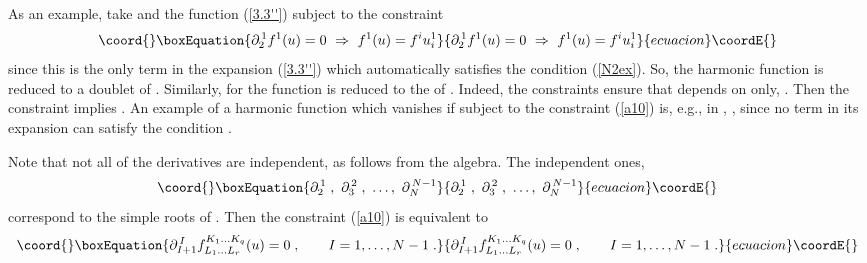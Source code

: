 \documentclass[a4paper,12pt]{article}
\begin{document}
As an example, take \coordHE{} and the function \coordHE{} (\ref{3.3''}) 
subject to the constraint 
\begin{equation}\coord{}\boxEquation{\label{N2ex}
  \partial^{\,1}_2f^1(u) = 0 \ \Rightarrow \ f^1(u) = f^i u^1_i
}{\partial^{\,1}_2f^1(u) = 0 \ \Rightarrow \ f^1(u) = f^i u^1_i
}{ecuacion}\coordE{}\end{equation}
since this is the only term in the expansion (\ref{3.3''}) which 
automatically satisfies the condition (\ref{N2ex}). So, the 
harmonic function is reduced to a doublet of \coordHE{}. 
Similarly, for \coordHE{} the function \coordHE{} is reduced to the 
\coordHE{} of \coordHE{}. Indeed, the constraints 
\coordHE{} ensure that \coordHE{} depends on 
\coordHE{} only, \coordHE{}. Then the constraint 
\coordHE{} implies \coordHE{}. An example of a harmonic function which vanishes if 
subject to the constraint (\ref{a10}) is, e.g., in \coordHE{}, 
\coordHE{}, since no term in its expansion can satisfy 
the condition \coordHE{}.  

Note that not all of the derivatives \coordHE{} 
are independent, as follows from the \coordHE{} algebra. The 
independent ones,
\begin{equation}\coord{}\boxEquation{\label{rankder}
  \partial^{\,1}_2\;,\ \partial^{\,2}_3\;,\ \ldots,\ \partial^{\,N-1}_N 
}{\partial^{\,1}_2\;,\ \partial^{\,2}_3\;,\ \ldots,\ \partial^{\,N-1}_N 
}{ecuacion}\coordE{}\end{equation}
correspond to the simple roots of \coordHE{}. Then the 
constraint (\ref{a10}) is equivalent to 
\begin{equation}\coord{}\boxEquation{\label{a100}
\partial^{\,I}_{I+1} f^{K_1\ldots K_q}_{L_1\ldots L_r}(u) = 0\;, 
\qquad I=1,\ldots, N-1\;. 
}{\partial^{\,I}_{I+1} f^{K_1\ldots K_q}_{L_1\ldots L_r}(u) = 0\;, 
\qquad I=1,\ldots, N-1\;. 
}{ecuacion}\coordE{}\end{equation}
\end{document}
